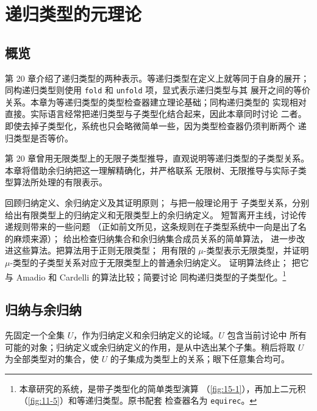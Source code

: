 
\chapter{递归类型的元理论}
\label{chap:21}

\section*{概览}

第 20 章介绍了递归类型的两种表示。等递归类型在定义上就等同于自身的展开；
同构递归类型则使用 \texttt{fold} 和 \texttt{unfold} 项，显式表示递归类型与其
展开之间的等价关系。本章为等递归类型的类型检查器建立理论基础；同构递归类型的
实现相对直接。实际语言经常把递归类型与子类型化结合起来，因此本章同时讨论
二者。即使去掉子类型化，系统也只会略微简单一些，因为类型检查器仍须判断两个
递归类型是否等价。

第 20 章曾用无限类型上的无限子类型推导，直观说明等递归类型的子类型关系。
本章将借助余归纳把这一理解精确化，并严格联系
无限树、无限推导与实际子类型算法所处理的有限表示。

回顾归纳定义、余归纳定义及其证明原则；
与把一般理论用于
子类型关系，分别给出有限类型上的归纳定义和无限类型上的余归纳定义。
短暂离开主线，讨论传递规则带来的一些问题
（正如前文所见，这条规则在子类型系统中一向是出了名的麻烦来源）；
给出检查归纳集合和余归纳集合成员关系的简单算法，
进一步改进这些算法。把算法用于正则无限类型；
用有限的 \(\mu\)-类型表示无限类型，并证明
\(\mu\)-类型的子类型关系对应于无限类型上的普通余归纳定义。
证明算法终止；
把它与 Amadio 和 Cardelli 的算法比较；简要讨论
同构递归类型的子类型化。\footnote{本章研究的系统，是带子类型化的简单类型演算
（\cref{fig:15-1}），再加上二元积（\cref{fig:11-5}）和等递归类型。原书配套
检查器名为 \texttt{equirec}。}

\section{归纳与余归纳}
\label{sec:21.1}

先固定一个全集 \(U\)，作为归纳定义和余归纳定义的论域。\(U\) 包含当前讨论中
所有可能的对象；归纳定义或余归纳定义的作用，是从中选出某个子集。稍后将取
\(U\) 为全部类型对的集合，使 \(U\) 的子集成为类型上的关系；眼下任意集合均可。

